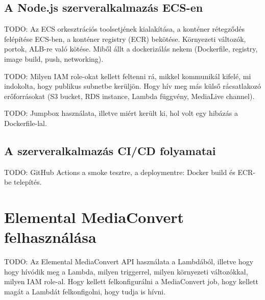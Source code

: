 \subsection{A Node.js szerveralkalmazás ECS-en}

TODO: Az ECS orkesztrációs toolsetjének kialakítása, a konténer rétegződés felépítése ECS-ben, a konténer registry (ECR) bekötése. Környezeti változók, portok, ALB-re való kötése. Miből állt a dockerizálás nekem (Dockerfile, registry, image build, push, networking).

TODO: Milyen IAM role-okat kellett feltenni rá, mikkel kommunikál kifelé, mi indokolta, hogy publikus subnetbe kerüljön. Hogy hív meg más külső rácsatlakozó erőforrásokat (S3 bucket, RDS instance, Lambda függvény, MediaLive channel).

TODO: Jumpbox használata, illetve miért került ki, hol volt egy hibázás a Dockerfile-lal.

\subsection{A szerveralkalmazás CI/CD folyamatai}

TODO: GitHub Actions a smoke tesztre, a deploymentre: Docker build és ECR-be telepítés.

\section{Elemental MediaConvert felhasználása}

TODO: Az Elemental MediaConvert API használata a Lambdából, illetve hogy hogy hívódik meg a Lambda, milyen triggerrel, milyen környezeti változókkal, milyen IAM role-al. Hogy kellett felkonfigurálni a MediaConvert job, hogy kellett magát a Lambdát felkonfigolni, hogy tudja is hívni.
